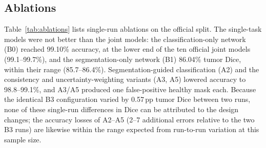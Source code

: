 \documentclass[journal]{IEEEtran}
\begin{document}
\begin{table}[!t]
\caption{Official-Split vs.\ Leakage-Free (LF) 5-Seed Ensembles on Test Subsets}
\label{tab:leakage}
\centering
\footnotesize
\setlength{\tabcolsep}{3pt}
\end{table}

\subsection{Ablations}
Table~\ref{tab:ablations} lists single-run ablations on the official split. The single-task models were not better than the joint models: the classification-only network (B0) reached 99.10\% accuracy, at the lower end of the ten official joint models (99.1--99.7\%), and the segmentation-only network (B1) 86.04\% tumor Dice, within their range (85.7--86.4\%). Segmentation-guided classification (A2) and the consistency and uncertainty-weighting variants (A3, A5) lowered accuracy to 98.8--99.1\%, and A3/A5 produced one false-positive healthy mask each. Because the identical B3 configuration varied by 0.57\,pp tumor Dice between two runs, none of these single-run differences in Dice can be attributed to the design changes; the accuracy losses of A2--A5 (2--7 additional errors relative to the two B3 runs) are likewise within the range expected from run-to-run variation at this sample size.
\end{document}
